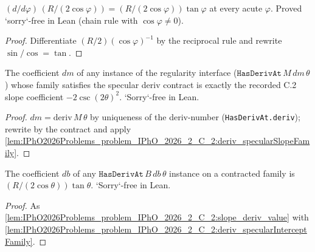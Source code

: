 \begin{lemma}
\label{lem:IPhO2026Problems_problem_IPhO_2026_2_C_2:deriv_specularInterceptFamily}
$(d/d\varphi)\,(R/(2\cos\varphi)) = (R/(2\cos\varphi))\tan\varphi$ at
every acute $\varphi$.  Proved `sorry`-free in Lean
(chain rule with $\cos\varphi \ne 0$).
\end{lemma}
\begin{proof}
Differentiate $(R/2)(\cos\varphi)^{-1}$ by the reciprocal rule and
rewrite $\sin/\cos = \tan$.
\end{proof}

\begin{lemma}
\label{lem:IPhO2026Problems_problem_IPhO_2026_2_C_2:slope_deriv_value}
The coefficient $dm$ of any instance of the regularity interface
($\texttt{HasDerivAt}\,M\,dm\,\theta$) whose family satisfies the
specular deriv contract is exactly the recorded C.2 slope coefficient
$-2\csc(2\theta)^{2}$.  `Sorry`-free in Lean.
\end{lemma}
\begin{proof}
$dm = \mathrm{deriv}\,M\,\theta$ by uniqueness of the deriv-number
(\texttt{HasDerivAt.deriv}); rewrite by the contract and apply
\cref{lem:IPhO2026Problems_problem_IPhO_2026_2_C_2:deriv_specularSlopeFamily}.
\end{proof}

\begin{lemma}
\label{lem:IPhO2026Problems_problem_IPhO_2026_2_C_2:intercept_deriv_value}
The coefficient $db$ of any $\texttt{HasDerivAt}\,B\,db\,\theta$ instance
on a contracted family is $(R/(2\cos\theta))\tan\theta$.  `Sorry`-free
in Lean.
\end{lemma}
\begin{proof}
As
\cref{lem:IPhO2026Problems_problem_IPhO_2026_2_C_2:slope_deriv_value}
with
\cref{lem:IPhO2026Problems_problem_IPhO_2026_2_C_2:deriv_specularInterceptFamily}.
\end{proof}

